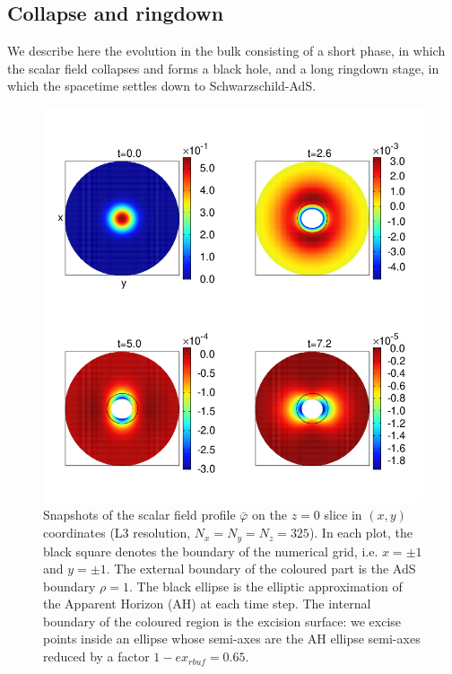 \documentclass[a4paper,11pt]{article}
\begin{document}


\subsection{Collapse and ringdown}\label{sec:rescolring}

We describe here the evolution in the bulk consisting of a short phase, in which the scalar field collapses and forms a black hole, and a long ringdown stage, in which the spacetime settles down to Schwarzschild-AdS.

\begin{figure}[!h]
        \centering
        \includegraphics[width=5.0in,clip=true]{plots/bulkplots/L3/phi1/phi1_L3_snapshots_2by2.png}
\parbox{5.0in}{\caption{Snapshots of the scalar field profile $\bar{\varphi}$ on the $z=0$ slice in $(x,y)$ coordinates (L3 resolution, $N_x=N_y=N_z=325$). In each plot, the black square denotes the boundary of the numerical grid, i.e. $x=\pm 1$ and $y=\pm 1$. The external boundary of the coloured part is the AdS boundary $\rho=1$. The black ellipse is the elliptic approximation of the Apparent Horizon (AH) at each time step. The internal boundary of the coloured region is the excision surface: we excise points inside an ellipse whose semi-axes are the AH ellipse semi-axes reduced by a factor $1-ex_{rbuf}=0.65$.
        }\label{fig:snapshotsscalarfield}}
\end{figure}
\end{document}
